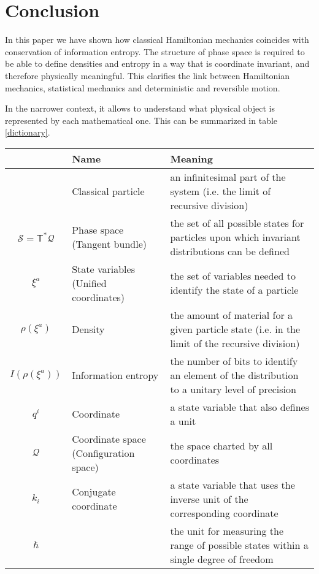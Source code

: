 \documentclass[11pt]{article}
\begin{document}
\section{Conclusion}

In this paper we have shown how classical Hamiltonian mechanics coincides with conservation of information entropy. The structure of phase space is required to be able to define densities and entropy in a way that is coordinate invariant, and therefore physically meaningful. This clarifies the link between Hamiltonian mechanics, statistical mechanics and deterministic and reversible motion.

In the narrower context, it allows to understand what physical object is represented by each mathematical one. This can be summarized in table \ref{dictionary}.
\begin{table}[h]
	\centering
	\begin{tabular}{c p{} p{} }
		& Name & Meaning\\ 
		\hline 
		& Classical particle & an infinitesimal part of the system (i.e. the limit of recursive division) \\ 
		$\mathcal{S} =\mathsf{T}^*\mathcal{Q}$ & Phase space \newline (Tangent bundle) & the set of all possible states for particles upon which invariant distributions can be defined \\
		$\xi^a$ & State variables \newline (Unified coordinates) & the set of variables needed to identify the state of a particle \\ 
		$\rho(\xi^a)$ & Density & the amount of material for a given particle state (i.e. in the limit of the recursive division)\\ 
		$I(\rho(\xi^a))$ & Information entropy & the number of bits to identify an element of the distribution to a unitary level of precision\\ 
		$q^i$ & Coordinate & a state variable that also defines a unit \\
		$\mathcal{Q}$ & Coordinate space \newline (Configuration space) & the space charted by all coordinates \\
		$k_i$ & Conjugate coordinate & a state variable that uses the inverse unit of the corresponding coordinate \\
		$\hbar$ & & the unit for measuring the range of possible states within a single degree of freedom \\

\end{tabular}
\end{table}
\end{document}
